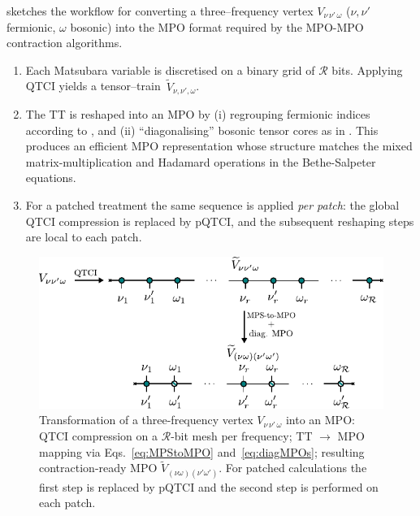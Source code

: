  sketches the workflow for converting a three–frequency vertex
\(V_{\nu\,\nu'\,\omega}\) (\(\nu,\nu'\) fermionic, \(\omega\) bosonic) into the MPO format required by the MPO-MPO contraction algorithms.
\begingroup
\renewcommand{\labelenumi}{(\alph{enumi})}
\begin{enumerate}
  \item Each Matsubara variable is discretised on a binary grid of \(\mathcal R\) bits. Applying QTCI yields a tensor–train\footnotemark\, \( \widetilde V_{\nu,\nu',\omega}\).
  \item The TT is reshaped into an MPO by
        (i) regrouping fermionic indices according to , and
        (ii) ``diagonalising'' bosonic tensor cores as in .  
        This produces an efficient MPO representation whose structure matches the mixed matrix-multiplication and Hadamard operations in
        the Bethe-Salpeter equations.
  \item For a patched treatment the same sequence is applied \textit{per
        patch}: the global QTCI compression is replaced by pQTCI, and the
        subsequent reshaping steps are local to each patch.
\end{enumerate}
\endgroup
{}

\begin{figure}[htpb]
    \centering
    \includegraphics{figures/MPStoMPOVertex.pdf}
    \caption{Transformation of a three-frequency vertex
    \(V_{\nu\,\nu'\,\omega}\) into an MPO: QTCI compression on a \(\mathcal R\)-bit mesh per frequency; TT \(\rightarrow\) MPO mapping via Eqs.~\eqref{eq:MPStoMPO} and~\eqref{eq:diagMPOs}; resulting contraction-ready MPO \(\widetilde V_{(\nu\omega)(\nu'\omega')}\).
    For patched calculations the first step is replaced by pQTCI and the second step is performed on each patch.}
    \label{fig:vertexMPStoMPO}
\end{figure}


